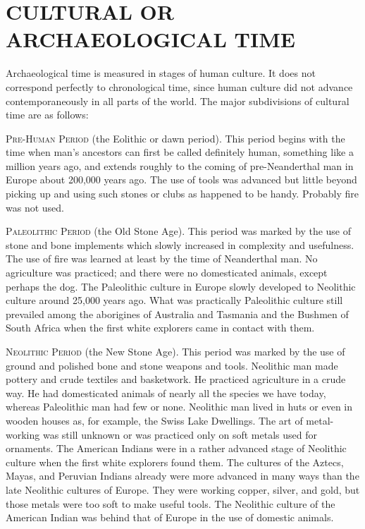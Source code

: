 \section*{CULTURAL OR ARCHAEOLOGICAL TIME}

Archaeological time is measured in stages of human culture. It does not correspond perfectly to chronological
time, since human culture did not advance contemporaneously in all parts of the world. The major subdivisions
of cultural time are as follows:

\textsc{Pre-Human Period} (the Eolithic or dawn period). This period begins with the time when man's ancestors
can first be called definitely human, something like a million years ago, and extends roughly to the coming of
pre-Neanderthal man in Europe about 200,000 years ago. The use of tools was advanced but little beyond picking
up and using such stones or clubs as happened to be handy. Probably fire was not used.

\textsc{Paleolithic Period} (the Old Stone Age). This period was marked by the use of stone and bone implements
which slowly increased in complexity and usefulness. The use of fire was learned at least by the time of
Neanderthal man. No agriculture was practiced; and there were no domesticated animals, except perhaps the dog.
The Paleolithic culture in Europe slowly developed to Neolithic culture around 25,000 years ago. What was
practically Paleolithic culture still prevailed among the aborigines of Australia and Tasmania and the Bushmen
of South Africa when the first white explorers came in contact with them.

\textsc{Neolithic Period} (the New Stone Age). This period was marked by the use of ground and polished bone and
stone weapons and tools. Neolithic man made pottery and crude textiles and basketwork. He practiced agriculture
in a crude way. He had domesticated animals of nearly all the species we have today, whereas Paleolithic man had
few or none. Neolithic man lived in huts or even in wooden houses as, for example, the Swiss Lake Dwellings. The
art of metal-working was still unknown or was practiced only on soft metals used for ornaments. The American
Indians were in a rather advanced stage of Neolithic culture when the first white explorers found them. The
cultures of the Aztecs, Mayas, and Peruvian Indians already were more advanced in many ways than the late
Neolithic cultures of Europe. They were working copper, silver, and gold, but those metals were too soft to
make useful tools. The Neolithic culture of the American Indian was behind that of Europe in the use of domestic
animals.

